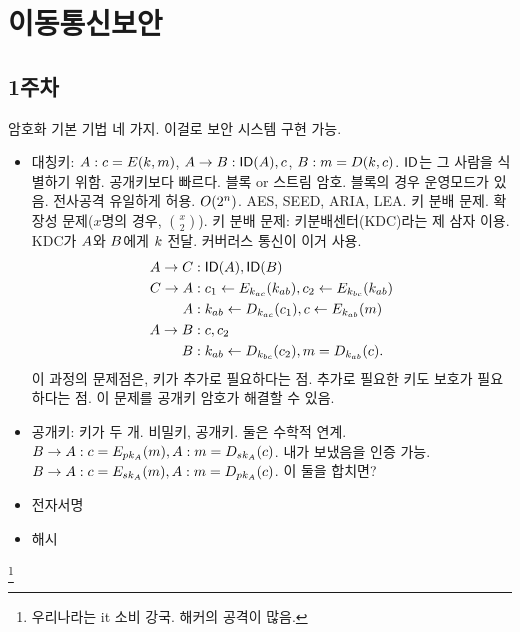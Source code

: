 \section{이동통신보안}

\subsection*{1주차}

암호화 기본 기법 네 가지. 이걸로 보안 시스템 구현 가능.
\begin{itemize}
  \item 대칭키: $A: c = E(k, m)$, $A \to B: \textsf{ID}(A), 
        c$, $B: m = D(k, c)$. $\textsf{ID}$는 그 사람을 식별하기 위함. 
        공개키보다 빠르다. 블록 or 스트림 암호.
        블록의 경우 운영모드가 있음. 전사공격 유일하게 허용. $O(2^{n})$. 
        AES, SEED, ARIA, LEA. 키 분배 문제. 확장성 문제($x$명의 경우, $\binom{x}{2}$).
        키 분배 문제: 키분배센터(KDC)라는 제 삼자 이용. KDC가 $A$와 $B$에게 $k$
        전달. 커버러스 통신이 이거 사용.
        \begin{equation}
          \begin{split}
            A \to C&: \textsf{ID}(A), \textsf{ID}(B) \\
            C \to A&: c_1 \leftarrow E_{k_{ac}}(k_{ab}), 
            c_2 \leftarrow E_{k_{bc}}(k_{ab}) \\
            A&: k_{ab} \leftarrow D_{k_{ac}}(c_1), 
            c \leftarrow E_{k_{ab}}(m) \\
            A \to B&: c, c_2 \\
            B&: k_{ab} \leftarrow D_{k_{bc}}(c_2), 
            m = D_{k_{ab}}(c).
          \end{split}
        \end{equation}
        이 과정의 문제점은, 키가 추가로 필요하다는 점. 추가로 필요한 키도 보호가 필요하다는 점.
        이 문제를 공개키 암호가 해결할 수 있음.
  \item 공개키: 키가 두 개. 비밀키, 공개키. 둘은 수학적 연계.
        $B \to A: c = E_{pk_{A}}(m), 
        A: m = D_{sk_{A}}(c)$.
        내가 보냈음을 인증 가능.  
        $B \to A: c = E_{sk_{A}}(m), 
        A: m = D_{pk_{A}}(c)$.
        이 둘을 합치면? 
  \item 전자서명
  \item 해시
\end{itemize}


\footnote{우리나라는 it 소비 강국. 해커의 공격이 많음.}